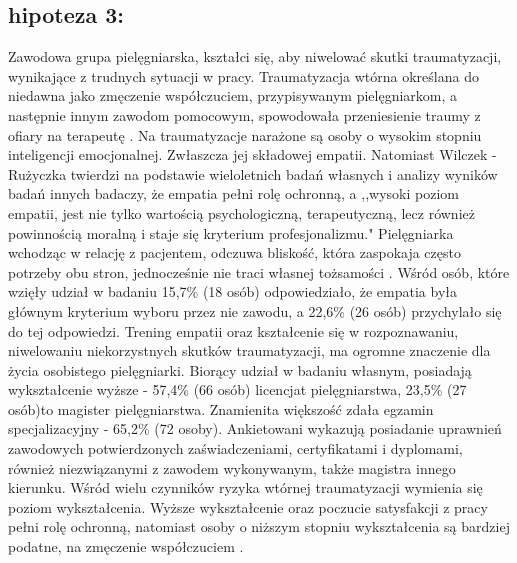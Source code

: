 \documentclass[a4paper,12pt,twoside,openany]{report}
\begin{document}
\subsection*{hipoteza 3:} 

Zawodowa grupa pielęgniarska, kształci się, aby niwelować skutki traumatyzacji, wynikające z trudnych sytuacji w pracy. Traumatyzacja wtórna określana do niedawna jako zmęczenie współczuciem, przypisywanym pielęgniarkom, a następnie innym zawodom pomocowym, spowodowała przeniesienie traumy z ofiary na terapeutę \cite{figley}. Na traumatyzacje narażone są osoby o wysokim stopniu inteligencji emocjonalnej. Zwłaszcza jej składowej empatii. Natomiast Wilczek - Rużyczka twierdzi na podstawie wieloletnich badań własnych i analizy wyników badań innych badaczy, że empatia pełni rolę ochronną, a ,,wysoki poziom empatii, jest nie tylko wartością psychologiczną, terapeutyczną, lecz również powinnością moralną i staje się kryterium profesjonalizmu."  Pielęgniarka wchodząc w relację z pacjentem, odczuwa bliskość, która zaspokaja często potrzeby obu stron, jednocześnie nie traci własnej tożsamości \cite{wilczek}. Wśród osób, które wzięły udział w badaniu  15,7\% (18 osób) odpowiedziało, że empatia była głównym kryterium wyboru przez nie zawodu, a 22,6\% (26 osób) przychylało się do tej odpowiedzi. Trening empatii oraz kształcenie się w  rozpoznawaniu, niwelowaniu niekorzystnych skutków traumatyzacji,  ma ogromne znaczenie dla życia osobistego pielęgniarki. Biorący udział w badaniu własnym,  posiadają wykształcenie wyższe - 57,4\% (66 osób) licencjat pielęgniarstwa,  23,5\% (27 osób)to magister pielęgniarstwa. Znamienita większość zdała egzamin specjalizacyjny - 65,2\% (72 osoby). Ankietowani wykazują posiadanie uprawnień zawodowych potwierdzonych zaświadczeniami, certyfikatami i dyplomami, również niezwiązanymi z zawodem wykonywanym, także magistra innego kierunku. Wśród wielu czynników ryzyka wtórnej traumatyzacji wymienia się poziom wykształcenia. Wyższe wykształcenie oraz poczucie satysfakcji z pracy pełni rolę ochronną, natomiast osoby o niższym stopniu wykształcenia są bardziej podatne, na zmęczenie współczuciem \cite{ogińska}.
\end{document}
